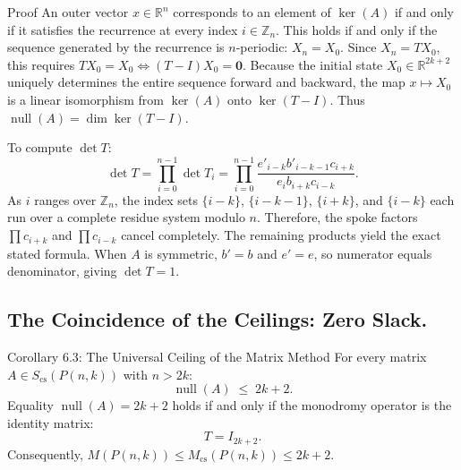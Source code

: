 \documentclass[11pt]{article}
\begin{document}
\begin{defbox}{Proof}
An outer vector $x \in \mathbb{R}^n$ corresponds to an element of $\ker(A)$ if and only if it satisfies the recurrence at every index $i \in \mathbb{Z}_n$. 
This holds if and only if the sequence generated by the recurrence is $n$-periodic: $X_n = X_0$.
Since $X_n = T X_0$, this requires $T X_0 = X_0 \iff (T - I)X_0 = \mathbf{0}$.
Because the initial state $X_0 \in \mathbb{R}^{2k+2}$ uniquely determines the entire sequence forward and backward, the map $x \mapsto X_0$ is a linear isomorphism from $\ker(A)$ onto $\ker(T - I)$.
Thus $\operatorname{null}(A) = \dim\ker(T - I)$.

To compute $\det T$:
\begin{equation}
  \det T = \prod_{i=0}^{n-1} \det T_i = \prod_{i=0}^{n-1} \frac{e'_{i-k} b'_{i-k-1} c_{i+k}}{e_i b_{i+k} c_{i-k}}.
\end{equation}
As $i$ ranges over $\mathbb{Z}_n$, the index sets $\{i-k\}$, $\{i-k-1\}$, $\{i+k\}$, and $\{i-k\}$ each run over a complete residue system modulo $n$.
Therefore, the spoke factors $\prod c_{i+k}$ and $\prod c_{i-k}$ cancel completely.
The remaining products yield the exact stated formula. When $A$ is symmetric, $b'=b$ and $e'=e$, so numerator equals denominator, giving $\det T = 1$. \qedhere
\end{defbox}

\subsection{The Coincidence of the Ceilings: Zero Slack.}

\begin{thmbox}{Corollary 6.3: The Universal Ceiling of the Matrix Method}
For every matrix $A \in S_{\mathrm{cs}}(P(n,k))$ with $n > 2k$:
\begin{equation}
  \operatorname{null}(A) \;\le\; 2k + 2.
\end{equation}
Equality $\operatorname{null}(A) = 2k + 2$ holds if and only if the monodromy operator is the identity matrix:
\begin{equation}
  T = I_{2k+2}.
\end{equation}
Consequently, $M(P(n,k)) \le M_{\mathrm{cs}}(P(n,k)) \le 2k+2$.
\end{thmbox}
\end{document}
